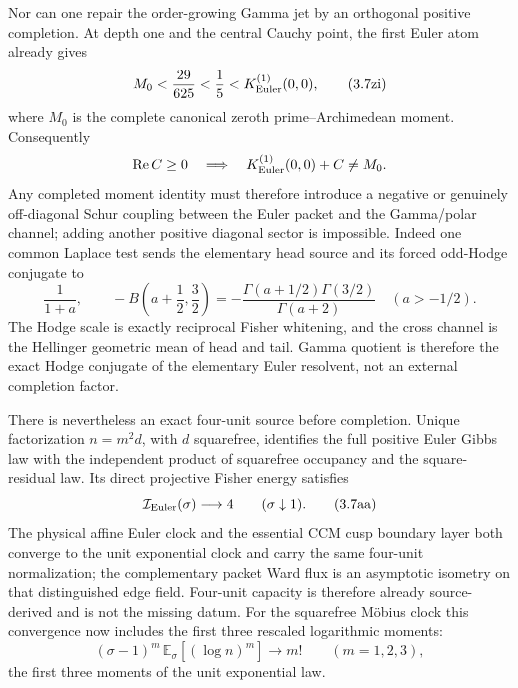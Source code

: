 \documentclass[11pt]{article}
\theoremstyle{definition}
\theoremstyle{remark}
\newcommand{\Rea}{\operatorname{Re}}
\begin{document}
Nor can one repair the order-growing Gamma jet by an orthogonal positive
completion.  At depth one and the central Cauchy point, the first Euler atom
already gives
\[
 M_0<\frac{29}{625}<\frac15
 <K^{(1)}_{\rm Euler}(0,0),
\tag{3.7zi}\label{eq:depth-one-positive-completion-no-go}
\]
where \(M_0\) is the complete canonical zeroth prime--Archimedean moment.
Consequently
\[
        \Rea C\ge0
        \quad\Longrightarrow\quad
        K^{(1)}_{\rm Euler}(0,0)+C\ne M_0.
\]
Any completed moment identity must therefore introduce a negative or
genuinely off-diagonal Schur coupling between the Euler packet and the
Gamma/polar channel; adding another positive diagonal sector is impossible.
Indeed one common Laplace test sends the elementary head source and its
forced odd-Hodge conjugate to
\[
        \frac1{1+a},\qquad
        -B\!\left(a+\frac12,\frac32\right)
        =-\frac{\Gamma(a+1/2)\Gamma(3/2)}{\Gamma(a+2)}
        \quad(a>-1/2).
\tag{3.7zb}\label{eq:hodge-beta-transgression}
\]
The Hodge scale is exactly reciprocal Fisher whitening, and the cross
channel is the Hellinger geometric mean of head and tail.  Gamma quotient is
therefore the exact Hodge conjugate of the elementary Euler resolvent, not
an external completion factor.

There is nevertheless an exact four-unit source before completion.  Unique
factorization \(n=m^2d\), with \(d\) squarefree, identifies the full positive
Euler Gibbs law with the independent product of squarefree occupancy and
the square-residual law.  Its direct projective Fisher energy satisfies
\[
       \mathcal I_{\rm Euler}(\sigma)\longrightarrow4
       \qquad(\sigma\downarrow1).
\tag{3.7aa}\label{eq:euler-four-unit}
\]
The physical affine Euler clock and the essential CCM cusp boundary layer
both converge to the unit exponential clock and carry the same four-unit
normalization; the complementary packet Ward flux is an asymptotic
isometry on that distinguished edge field.  Four-unit capacity is therefore
already source-derived and is not the missing datum.
For the squarefree M\"obius clock this convergence now includes the first
three rescaled logarithmic moments:
\[
 (\sigma-1)^m\,\mathbb E_\sigma[(\log n)^m]
      \longrightarrow m!\qquad(m=1,2,3),
\tag{3.7aaa}\label{eq:mobius-critical-clock-moments}
\]
the first three moments of the unit exponential law.
\end{document}
